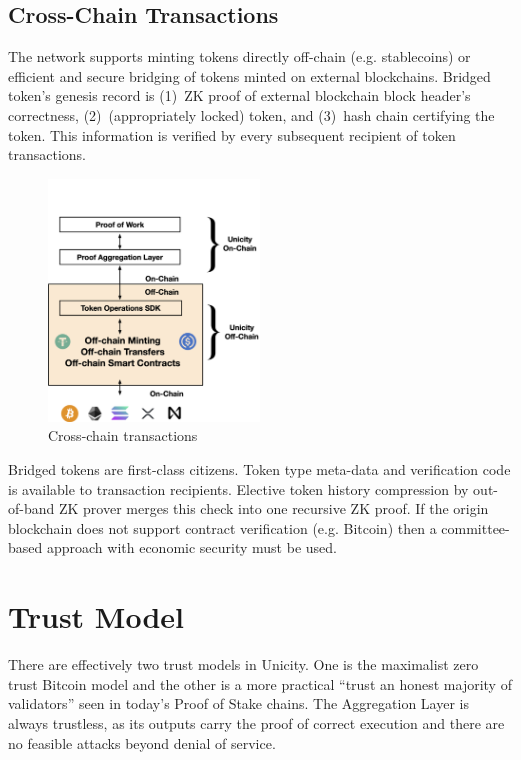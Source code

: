 \documentclass{article}
\begin{document}
\subsection{Cross-Chain Transactions}

The network supports minting tokens directly off-chain (e.g. stablecoins) or efficient and secure bridging of tokens minted on external blockchains. Bridged token's genesis record is (1)~ZK proof of external blockchain block header's correctness, (2)~(appropriately locked) token, and (3)~hash chain certifying the token. This information is verified by every subsequent recipient of token transactions.

\begin{figure}[ht]
    \centering
    \includegraphics[width=0.5\textwidth]{crosschain.png}
    \caption{Cross-chain transactions}
    \label{fig:CrossChain}
\end{figure}

Bridged tokens are first-class citizens. Token type meta-data and verification code is available to transaction recipients. Elective token history compression by out-of-band ZK prover merges this check into one recursive ZK proof. If the origin blockchain does not support contract verification (e.g. Bitcoin) then a committee-based approach with economic security must be used.

\section{Trust Model}
There are effectively two trust models in Unicity. One is the maximalist zero trust Bitcoin model and the other is a more practical ``trust an honest majority of validators'' seen in today's Proof of Stake chains. The Aggregation Layer is always trustless, as its outputs carry the proof of correct execution and there are no feasible attacks beyond denial of service.
\end{document}
